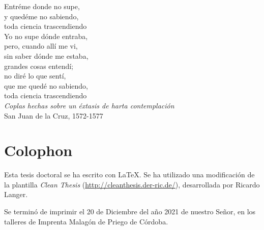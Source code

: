 %
\pagestyle{empty}
\hfill
\vfill
{}

Entréme donde no supe,\\ 
y quedéme no sabiendo,\\
toda ciencia trascendiendo\\ 

Yo no supe dónde entraba,\\
pero, cuando allí me vi,\\
sin saber dónde me estaba, \\
grandes cosas entendí;\\
no diré lo que sentí,\\
que me quedé no sabiendo,\\
toda ciencia trascendiendo \\


\textit{Coplas hechas sobre un éxtasis de harta contemplación} 
\\
San Juan de la Cruz, 1572-1577

\newpage
\hfill
\vfill
\section*{Colophon}
Esta tesis doctoral se ha escrito con \LaTeX{}. Se ha utilizado una modificación de la plantilla \textit{Clean Thesis} (\url{http://cleanthesis.der-ric.de/}), desarrollada por Ricardo Langer.  

Se terminó de imprimir el 20 de Diciembre del año 2021 de nuestro Señor, en los talleres de Imprenta Malagón de Priego de Córdoba. 